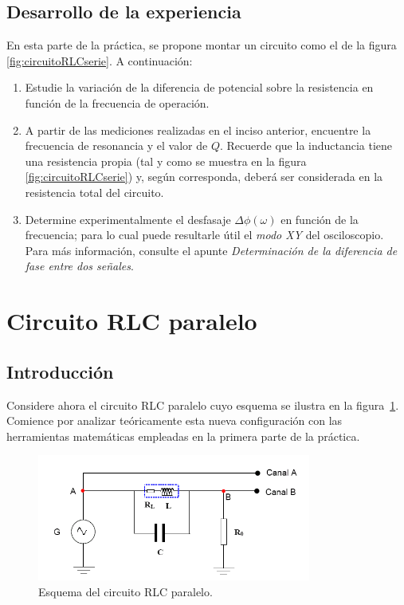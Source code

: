 \documentclass[laboratorio]{guia}
\begin{document}
\subsection{Desarrollo de la experiencia}
En esta parte de la práctica, se propone montar un circuito como el de la figura \ref{fig:circuitoRLCserie}.
A continuación:
\begin{enumerate}
    \item Estudie la variación de la diferencia de potencial sobre la resistencia en función de la frecuencia de operación. 
    \item A partir de las mediciones realizadas en el inciso anterior, encuentre la frecuencia de resonancia y el valor de \(Q\).
Recuerde que la inductancia tiene una resistencia propia (tal y como se muestra en la figura \ref{fig:circuitoRLCserie}) y, según corresponda, deberá ser considerada en la resistencia total del circuito.
    \item Determine experimentalmente el desfasaje \( \Delta \phi(\omega)\) en función de la frecuencia; para lo cual puede resultarle útil el {\it modo XY} del osciloscopio.
Para más información, consulte el apunte {\it Determinación de la diferencia de fase entre dos señales}.
\end{enumerate}



\section{Circuito RLC paralelo}

\subsection{Introducción}
Considere ahora el circuito RLC paralelo cuyo esquema se ilustra en la figura~\ref{fig:circuitoRLCparalelo}.
Comience por analizar teóricamente esta nueva configuración con las herramientas matemáticas empleadas en la primera parte de la práctica.

\begin{figure}[htb!]
    \centering
    \includegraphics[width=9cm]{LG06--001.png}
    \caption{Esquema del circuito RLC paralelo.}
    \label{fig:circuitoRLCparalelo}
\end{figure}
\end{document}
